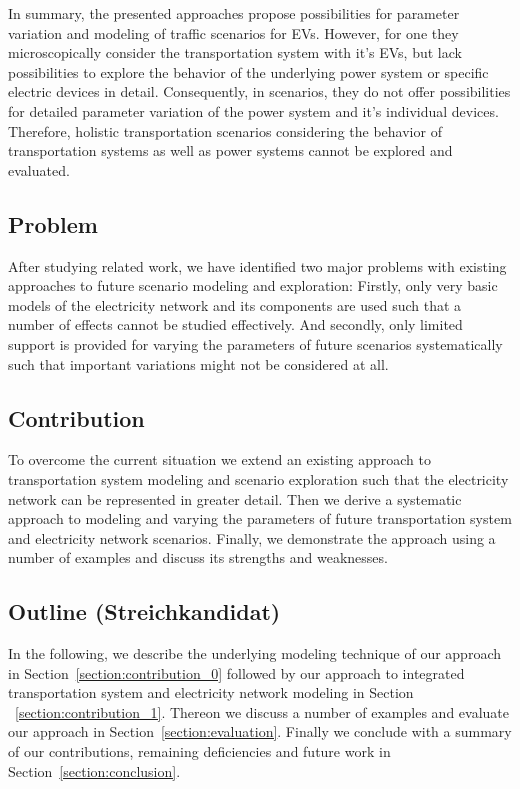 In summary, the presented approaches propose possibilities for parameter variation and modeling of traffic scenarios for EVs. However, for one they microscopically consider the transportation system with it's EVs, but lack possibilities to explore the behavior of the underlying power system or specific electric devices in detail. Consequently, in scenarios, they do not offer possibilities for detailed parameter variation of the power system and it's individual devices. Therefore, holistic transportation scenarios considering the behavior of transportation systems as well as power systems cannot be explored and evaluated.

\subsection{Problem}
After studying related work, we have identified two major problems with existing approaches to future scenario modeling and exploration: Firstly, only very basic models of the electricity network and its components are used such that a number of effects cannot be studied effectively. And secondly, only limited support is provided for varying the parameters of future scenarios systematically such that important variations might not be considered at all.
\subsection{Contribution}
To overcome the current situation we extend an existing approach to transportation system modeling and scenario exploration such that the electricity network can be represented in greater detail. Then we derive a systematic approach to modeling and varying the parameters of future transportation system and electricity network scenarios. Finally, we demonstrate the approach using a number of examples and discuss its strengths and weaknesses.

\subsection{Outline (Streichkandidat)}

In the following, we describe the underlying modeling technique of our approach in Section~\ref{section:contribution_0} followed by our approach to integrated transportation system and electricity network modeling in Section ~\ref{section:contribution_1}. Thereon we discuss a number of examples and evaluate our approach in Section~\ref{section:evaluation}. Finally we conclude with a summary of our contributions, remaining deficiencies and future work in Section~\ref{section:conclusion}.